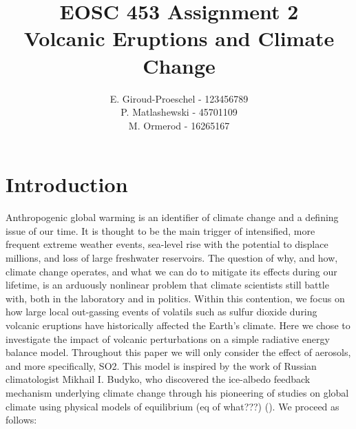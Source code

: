 \documentclass[12pt]{article}
\title{EOSC 453 Assignment 2\\
\large Volcanic Eruptions and Climate Change}
\author{
    E. Giroud-Proeschel - 123456789 \\
    P. Matlashewski - 45701109\\
    M. Ormerod - 16265167
}
\begin{document}
\maketitle
\newpage
\tableofcontents
\newpage

\section{Introduction}
Anthropogenic global warming is an identifier of climate change and a defining 
issue of our time. It is thought to be the main trigger of intensified, more frequent
extreme weather events, sea-level rise with the potential
to displace millions, and loss of large freshwater reservoirs.
The question of why, and how, climate change operates, and what we can do to mitigate 
its effects during our lifetime, is an arduously nonlinear problem that climate scientists
still battle with, both in the laboratory and in politics. Within this contention, we focus on
how large local out-gassing events of volatils such as sulfur dioxide during volcanic eruptions
have historically affected the Earth's climate. Here we chose to investigate
the impact of volcanic perturbations on a simple radiative
energy balance model. Throughout this paper we will only consider the effect of aerosols,
and more specifically, SO2. This model is inspired by the
work of Russian climatologist Mikhail I. Budyko, who discovered the ice-albedo
feedback mechanism underlying climate change through his pioneering of studies
on global climate using physical models of equilibrium (eq of what???) (\cite{budyko_albedo}).
We proceed as follows:

\end{document}
